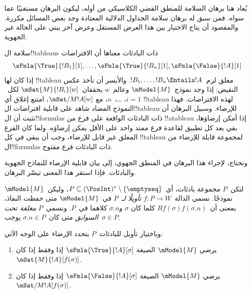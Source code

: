 \documentclass[../../../include/open-logic-section]{subfiles}
\begin{document}


\begin{editorial}
  يُعاد هنا برهان السلامة للمنطق القضي الكلاسيكي من أوله، ليكون البرهان
  مستغنيًا عما سواه. فمن سبق له برهان سلامة الجداول الدلالية المعتادة
  وجد بعض المسائل مكررة. والمقصود أن يتاح الاختيار بين هذا العرض
  المستقل وعرض آخر يبني على الحالة غير الجهوية.
\end{editorial}

\begin{explain}
  سلامة ال!!{tableau}s ذات البادئات معناها أن الافتراضات
  \[
  \sFmla{\True}{!B_1}[1], \dots, \sFmla{\True}{!B_n}[1], \sFmla{\False}{!A}[1]
  \]
  إذا كان لها !!{tableau} مغلق لزم~$!B_1, \dots, !B_n \Entails !A$.
  والأيسر أن نأخذ عكس النقيض: إذا وجد نموذج~$\mModel{M}$ وعالم~$w$
  يحققان~$\mSat{M}{!B_i}[w]$ لكل~$i=1$، \dots،~$n$، مع
  $\mSat/{M}{!A}[w]$، امتنع إغلاق أي !!{tableau} لهذه الافتراضات.
  فهذا النموذج المضاد شاهد على قابلية افتراضات ال!!{tableau} للإرضاء.
  وسبيل البرهان أن نثبت أن ال!!{formula}s ذات البادئات الواقعة على
  فرع من !!a{tableau} إذا أمكن إرضاؤها، بقي بعد كل تطبيق لقاعدة
  فرع ممتد واحد على الأقل يمكن إرضاؤه. ولما كان الفرع المغلق غير قابل
  للإرضاء، وجب أن يبقى في كل !!{tableau} لمجموعة قابلة للإرضاء من
  ال!!{formula}s ذات البادئات فرع مفتوح.

  ونحتاج، لإجراء هذا البرهان في المنطق الجهوي، إلى بيان قابلية الإرضاء
  للنماذج الجهوية والبادئات. فإذا استقر هذا المعنى تيسّر البرهان.
\end{explain}

\begin{defn}
  لتكن~$P$ مجموعة بادئات، أي~$P \subseteq (\PosInt)^*
  \setminus \{\emptyseq\}$، وليكن~$\mModel{M}$ نموذجًا.
  نسمي الدالة~$f\colon P \to W$ \emph{تأويلًا لـ}~$P$ في~$\mModel{M}$
  متى حفظت النفاذ، بمعنى أن~$Rf(\sigma)f(\sigma.n)$ كلما كان
  $\sigma$ و$\sigma.n$ كلاهما في~$P$.
  ونسمي~$P$ \emph{مغلقة تحت السوابق} متى كان~$\sigma.n \in P$
  يوجب~$\sigma \in P$.

  وباختيار تأويل للبادئات~$P$ يتحدد الإرضاء على الوجه الآتي:
  \begin{enumerate}
  \item يرضي $\mModel{M}$ الصيغة $\sFmla{\True}{!A}[\sigma]$ إذا وفقط إذا
    كان $\mSat{M}{!A}[f(\sigma)]$.
  \item يرضي $\mModel{M}$ الصيغة $\sFmla{\False}{!A}[\sigma]$ إذا وفقط إذا
    كان $\mSat/{M}{!A}[f(\sigma)]$.
  \end{enumerate}
\end{defn}
\end{document}
